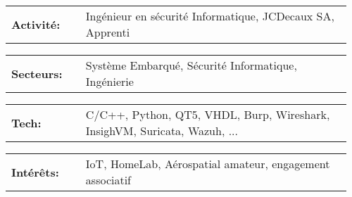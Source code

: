 \documentclass[10pt,A4]{article}
\newcommand{\tzlarrow}{(0,0) -- (0.2,0) -- (0.3,0.2) -- (0.2,0.4) -- (0,0.4) -- (0.1,0.2) -- cycle;}
\newcommand{\larrow}[1]
{\begin{tikzpicture}[scale=0.58]
	 \filldraw[fill=#1!100,draw=#1!100!black]  \tzlarrow
 \end{tikzpicture}
}
\newcommand{\metasection}[2]{
	\begin{tabular*}{1\linewidth}{p{0.21\linewidth} p{0.75\linewidth}}
		\larrow{bgcol}\normalsize{\textbf{\textcolor{sectcol}{#1}}}&#2\\
	\end{tabular*}
}
\newcommand{\spread}{7pt}
\begin{document}
\begin{minipage}[t]{0.485\textwidth}

\vspace{\spread}

\metasection{Activité:}{Ingénieur en sécurité Informatique, JCDecaux SA, Apprenti}
\metasection{Secteurs:}{Système Embarqué, Sécurité Informatique, Ingénierie} 
\end{minipage}
\hfill
\begin{minipage}[t]{0.485\textwidth}

\vspace{5pt}

\metasection{Tech:}{C/C++, Python, QT5, VHDL, Burp, Wireshark, InsighVM, Suricata, Wazuh, ...}
\metasection{Intérêts:}{IoT, HomeLab, Aérospatial amateur, engagement associatif}
\end{minipage}
\end{document}
